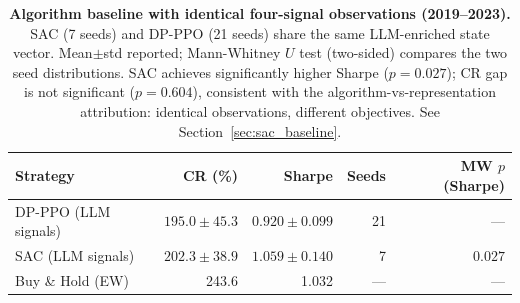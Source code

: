 \begin{table}[htbp]
\centering
\caption{\textbf{Algorithm baseline with identical four-signal observations (2019--2023).}
SAC (7 seeds) and DP-PPO (21 seeds) share the same LLM-enriched state vector.
Mean$\pm$std reported; Mann-Whitney $U$ test (two-sided) compares the two seed distributions.
SAC achieves significantly higher Sharpe ($p{=}0.027$); CR gap is not significant ($p{=}0.604$), consistent with the algorithm-vs-representation attribution: identical observations, different objectives.
See Section~\ref{sec:sac_baseline}.}
\label{tab:algorithm_baseline}
\begin{tabular}{lrrrr}
\toprule
\textbf{Strategy} & \textbf{CR (\%)} & \textbf{Sharpe} & \textbf{Seeds} & \textbf{MW $p$ (Sharpe)} \\
\midrule
DP-PPO (LLM signals) & $195.0 \pm 45.3$ & $0.920 \pm 0.099$ & 21 & --- \\
SAC (LLM signals)    & $202.3 \pm 38.9$ & $1.059 \pm 0.140$ &  7 & $\mathbf{0.027}$ \\
Buy \& Hold (EW)     & 243.6            & 1.032             & --- & --- \\
\bottomrule
\end{tabular}
\end{table}
